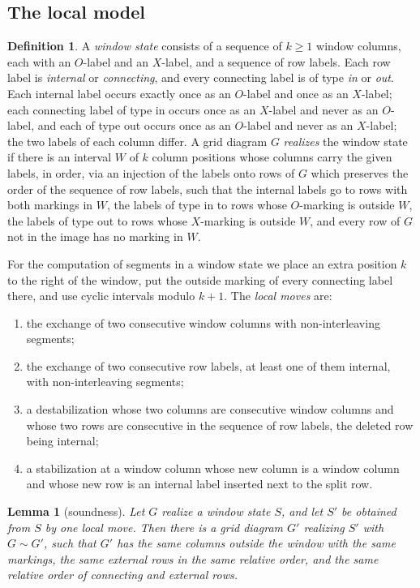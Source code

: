 \documentclass[11pt]{amsart}
\newtheorem{lemma}[theorem]{Lemma}
\theoremstyle{definition}
\newtheorem{definition}[theorem]{Definition}
\theoremstyle{remark}
\newcommand{\Mov}{\mathrel{\sim}}
\begin{document}
\subsection{The local model}
\begin{definition}\label{def:local}
A \emph{window state} consists of a sequence of $k\ge1$ window columns, each with an $O$-label and an
$X$-label, and a sequence of row labels. Each row label is \emph{internal} or \emph{connecting}, and
every connecting label is of type \emph{in} or \emph{out}. Each internal label occurs exactly once as
an $O$-label and once as an $X$-label; each connecting label of type in occurs once as an $X$-label and
never as an $O$-label, and each of type out occurs once as an $O$-label and never as an $X$-label; the
two labels of each column differ. A grid diagram $G$ \emph{realizes} the window state if there is an
interval $W$ of $k$ column positions whose columns carry the given labels, in order, via an injection
of the labels onto rows of $G$ which preserves the order of the sequence of row labels, such that the
internal labels go to rows with both markings in $W$, the labels of type in to rows whose $O$-marking is
outside $W$, the labels of type out to rows whose $X$-marking is outside $W$, and every row of $G$ not
in the image has no marking in $W$.
\end{definition}

For the computation of segments in a window state we place an extra position $k$ to the right of the
window, put the outside marking of every connecting label there, and use cyclic intervals modulo $k+1$.
The \emph{local moves} are:
\begin{enumerate}
\item[(c)] the exchange of two consecutive window columns with non-interleaving segments;
\item[(r)] the exchange of two consecutive row labels, at least one of them internal, with
non-interleaving segments;
\item[(d)] a destabilization whose two columns are consecutive window columns and whose two rows are
consecutive in the sequence of row labels, the deleted row being internal;
\item[(s)] a stabilization at a window column whose new column is a window column and whose new row is
an internal label inserted next to the split row.
\end{enumerate}

\begin{lemma}[soundness]\label{lem:sound}
Let $G$ realize a window state $S$, and let $S'$ be obtained from $S$ by one local move. Then there is a
grid diagram $G'$ realizing $S'$ with $G\Mov G'$, such that $G'$ has the same columns outside the window
with the same markings, the same external rows in the same relative order, and the same relative order
of connecting and external rows.
\end{lemma}
\end{document}
